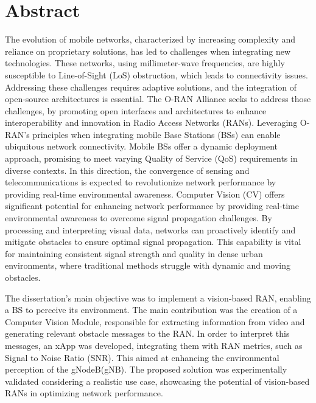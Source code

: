 
\chapter*{Abstract}
The evolution of mobile networks, characterized by increasing complexity and reliance on proprietary solutions, has led to challenges when integrating new technologies.
These networks, using millimeter-wave frequencies, are highly susceptible to Line-of-Sight (LoS) obstruction, which leads to connectivity issues.
Addressing these challenges requires adaptive solutions, and the integration of open-source architectures is essential.
The O-RAN Alliance seeks to address those challenges, by promoting open interfaces and architectures to enhance interoperability and innovation in Radio Access Networks (RANs).
Leveraging O-RAN's principles when integrating mobile Base Stations (BSs) can enable ubiquitous network connectivity.
Mobile BSs offer a dynamic deployment approach, promising to meet varying Quality of Service (QoS) requirements in diverse contexts.
In this direction, the convergence of sensing and telecommunications is expected to revolutionize network performance by providing real-time environmental awareness.
Computer Vision (CV) offers significant potential for enhancing network performance by providing real-time environmental awareness to overcome signal propagation challenges.
By processing and interpreting visual data, networks can proactively identify and mitigate obstacles to ensure optimal signal propagation.
This capability is vital for maintaining consistent signal strength and quality in dense urban environments, where traditional methods struggle with dynamic and moving obstacles.

The dissertation's main objective was to implement a vision-based RAN, enabling a BS to perceive its environment.
The main contribution was the creation of a Computer Vision Module, responsible for extracting information from video and generating relevant obstacle messages to the RAN\@.
In order to interpret this messages, an xApp was developed, integrating them with RAN metrics, such as Signal to Noise Ratio (SNR). This aimed at enhancing the environmental perception of the gNodeB(gNB).
The proposed solution was experimentally validated considering a realistic use case, showcasing the potential of vision-based RANs in optimizing network performance.
